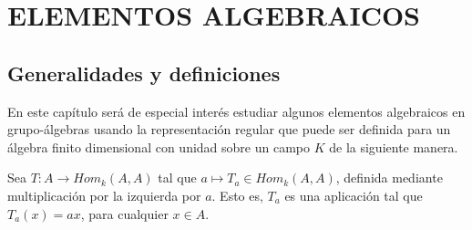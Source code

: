 \chapter{\hspace{1cm} ELEMENTOS ALGEBRAICOS}

\section{\quad Generalidades y definiciones}
En este capítulo será de especial interés estudiar algunos elementos algebraicos en grupo-álgebras usando la representación regular que puede ser definida para un álgebra finito dimensional con unidad sobre un campo $K$ de la siguiente manera.

\begin{definicion}
Sea $T \colon A \to Hom_k(A,A)$ tal que $a \mapsto T_a \in Hom_k(A,A)$, definida mediante multiplicación por la izquierda por $a$. Esto es, $T_a$ es una aplicación tal que $T_a(x) = ax$, para cualquier $x \in A$.  
\end{definicion}


